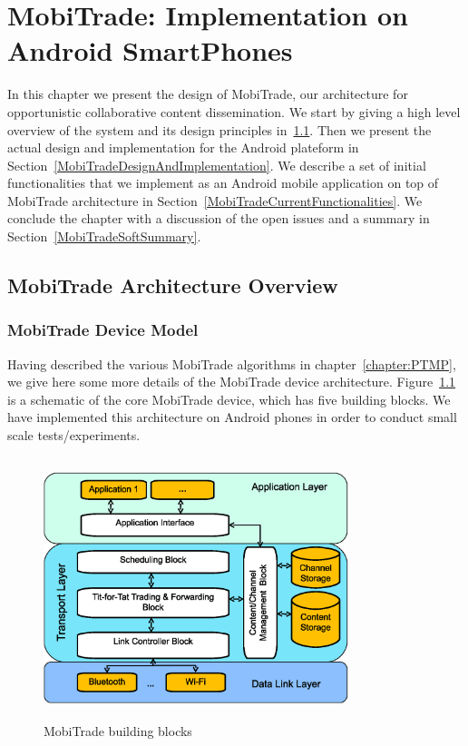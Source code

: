 \chapter{MobiTrade: Implementation on Android SmartPhones}
\label{chapter:MobiTrade}
\minitoc

In this chapter we present the design of MobiTrade, our architecture for opportunistic
collaborative content dissemination. We start by giving a high level overview of the system
and its design principles in~\ref{MobiTradeArchitecture}. Then we present the actual design and implementation
for the Android plateform in Section~\ref{MobiTradeDesignAndImplementation}. We describe a set of initial functionalities that we implement as an Android mobile application on top of MobiTrade architecture in Section~\ref{MobiTradeCurrentFunctionalities}. We conclude the chapter with a discussion of the open issues and a summary in Section~\ref{MobiTradeSoftSummary}.


\section{MobiTrade Architecture Overview}
\label{MobiTradeArchitecture}

\subsection{MobiTrade Device Model}
\label{MobiTrade-node}

Having described the various MobiTrade algorithms in chapter~\ref{chapter:PTMP}, we give here some more details of the MobiTrade device architecture. Figure~\ref{MobiTrade-node-architecture} is a schematic of the core MobiTrade device, which has five building blocks. We have implemented this architecture on Android phones in order to conduct small scale tests/experiments.

\begin{figure}[!h]
\centering
\includegraphics[width=3.5in,height=3in]{Chapitre5/MobiTrade_Node.eps}
\vspace{-0.1in}
\caption{MobiTrade building blocks}
\label{MobiTrade-node-architecture}
\vspace{-0.1in}
\end{figure}

